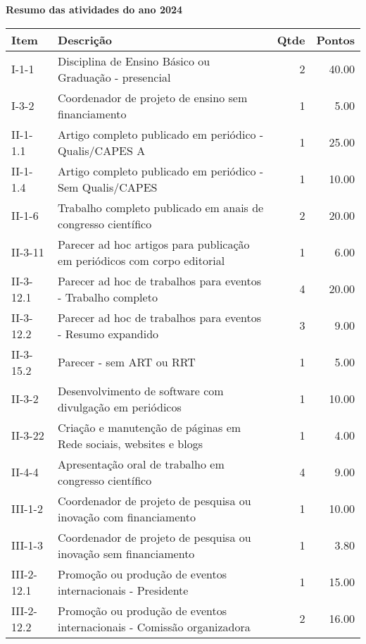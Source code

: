 \documentclass[11pt,a4paper]{article}
\begin{document}
\begin{center}
\large \textbf{
Resumo das atividades do ano 2024
}
\end{center}
\vspace{-0.5cm}
\begin{table}[ht]
\centering
\begin{tabular}{|l|p{12cm}|r|r|}
  \hline
{\textbf{Item}} & {\textbf{Descrição}} & {\textbf{Qtde}} & {\textbf{Pontos}} \\ 
  \hline
I-1-1 & Disciplina de Ensino Básico ou Graduação - presencial &   2 & 40.00 \\ 
  I-3-2 & Coordenador de projeto de ensino sem financiamento &   1 & 5.00 \\ 
  II-1-1.1 & Artigo completo publicado em periódico - Qualis/CAPES A &   1 & 25.00 \\ 
  II-1-1.4 & Artigo completo publicado em periódico - Sem Qualis/CAPES &   1 & 10.00 \\ 
  II-1-6 & Trabalho completo publicado em anais de congresso científico &   2 & 20.00 \\ 
  II-3-11 & Parecer ad hoc artigos para publicação em periódicos com corpo editorial &   1 & 6.00 \\ 
  II-3-12.1 & Parecer ad hoc de trabalhos para eventos - Trabalho completo &   4 & 20.00 \\ 
  II-3-12.2 & Parecer ad hoc de trabalhos para eventos - Resumo expandido &   3 & 9.00 \\ 
  II-3-15.2 & Parecer - sem ART ou RRT &   1 & 5.00 \\ 
  II-3-2 & Desenvolvimento de software com divulgação em periódicos &   1 & 10.00 \\ 
  II-3-22 & Criação e manutenção de páginas em Rede sociais, websites e blogs &   1 & 4.00 \\ 
  II-4-4 & Apresentação oral de trabalho em congresso científico &   4 & 9.00 \\ 
  III-1-2 & Coordenador de projeto de pesquisa ou inovação com financiamento &   1 & 10.00 \\ 
  III-1-3 & Coordenador de projeto de pesquisa ou inovação sem financiamento &   1 & 3.80 \\ 
  III-2-12.1 & Promoção ou produção de eventos internacionais - Presidente &   1 & 15.00 \\ 
  III-2-12.2 & Promoção ou produção de eventos internacionais - Comissão organizadora &   2 & 16.00 \\ 

\end{tabular}
\end{table}
\end{document}

